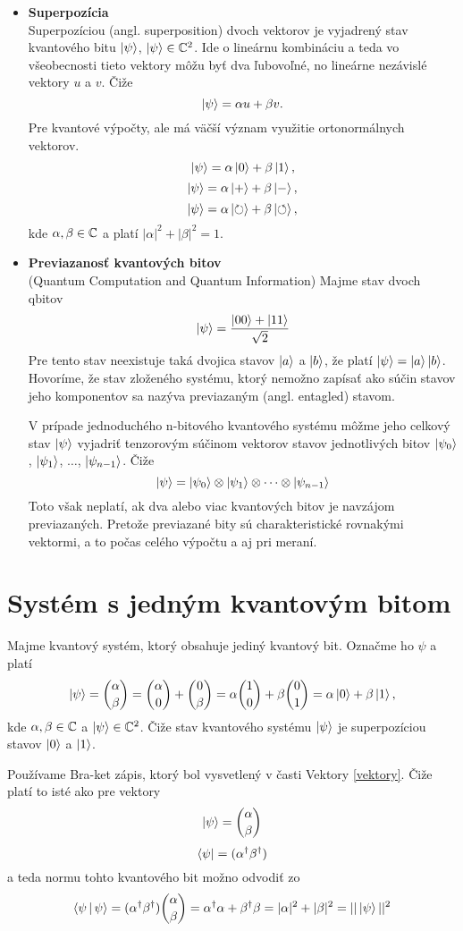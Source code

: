 \begin{itemize}
\item[] \textbf{Superpozícia} \\
Superpozíciou (angl. superposition) dvoch vektorov je vyjadrený stav kvantového bitu \(\Ket{\psi}\), \(\Ket{\psi} \in \mathbb{C}^2\).
Ide o lineárnu kombináciu a teda vo všeobecnosti tieto vektory môžu byť dva ľubovoľné, no lineárne nezávislé vektory \(u\) a \(v\). Čiže
\[\Ket{\psi} = \alpha u + \beta v.\]
Pre kvantové výpočty, ale má väčší význam využitie ortonormálnych vektorov.
\[\Ket{\psi} = \alpha \Ket{0} + \beta \Ket{1},\]
\[\Ket{\psi} = \alpha \Ket{+} + \beta \Ket{-},\]
\[\Ket{\psi} = \alpha \Ket{\circlearrowright} + \beta \Ket{\circlearrowleft},\]
kde \(\alpha, \beta \in \mathbb{C}\) a platí \(|\alpha|^2 + |\beta|^2 = 1\).

\item[] \textbf{Previazanosť kvantových bitov} \\
(Quantum Computation and Quantum Information) Majme stav dvoch qbitov
\[\Ket{\psi} = \frac{\Ket{00} + \Ket{11}}{\sqrt{2}}\]
Pre tento stav neexistuje taká dvojica stavov \(\Ket{a}\) a \(\Ket{b}\), že platí \(\Ket{\psi} = \Ket{a}\Ket{b}\).
Hovoríme, že stav zloženého systému, ktorý nemožno zapísať ako súčin stavov jeho komponentov sa nazýva previazaným (angl. entagled) stavom.

V prípade jednoduchého n-bitového kvantového systému môžme jeho celkový stav \(\Ket{\psi}\) vyjadriť tenzorovým súčinom vektorov stavov jednotlivých bitov \(\Ket{\psi_0}\), \(\Ket{\psi_1}\), \(\dots\), \(\Ket{\psi_{n-1}}\).
Čiže
\[\Ket{\psi} = \Ket{\psi_0} \otimes \Ket{\psi_1} \otimes \dots \otimes \Ket{\psi_{n-1}}\]
Toto však neplatí, ak dva alebo viac kvantových bitov je navzájom previazaných.
Pretože previazané bity sú charakteristické rovnakými vektormi, a to počas celého výpočtu a aj pri meraní.
\end{itemize}

\section{Systém s jedným kvantovým bitom}
Majme kvantový systém, ktorý obsahuje jediný kvantový bit. Označme ho \(\psi\)
a platí
\[\Ket{\psi} = \binom{\alpha}{\beta} = \binom{\alpha}{0} + \binom{0}{\beta} = \alpha \binom{1}{0} + \beta \binom{0}{1} = \alpha \Ket{0} + \beta \Ket{1}, \]
kde \(\alpha, \beta \in \mathbb{C}\) a \(\Ket{\psi} \in \mathbb{C}^{2}\).
Čiže stav kvantového systému \(\Ket{\psi}\) je superpozíciou stavov \(\Ket{0}\) a \(\Ket{1}\).

Používame Bra-ket zápis, ktorý bol vysvetlený v časti Vektory \ref{vektory}. 
Čiže platí to isté ako pre vektory
\[\Ket{\psi} = \binom{\alpha}{\beta}\]
\[\Bra{\psi} = (\alpha^{\dag}\beta^{\dag})\]
a teda normu tohto kvantového bit možno odvodiť zo
\[\Braket{\psi|\psi} = (\alpha^{\dag}\beta^{\dag})\binom{\alpha}{\beta} = \alpha^{\dag}\alpha + \beta^{\dag}\beta = |\alpha|^{2} + |\beta|^{2} = ||\Ket{\psi}||^{2}\]

